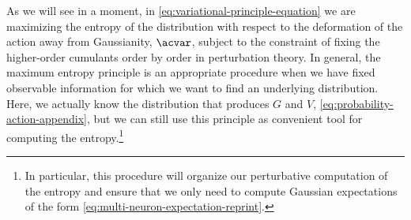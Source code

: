 {} As we will see in a moment, in \eqref{eq:variational-principle-equation} we are maximizing the entropy of the distribution with respect to the deformation of the action away from Gaussianity, $\acvar$, subject to the constraint of fixing the higher-order cumulants order by order in perturbation theory. In general, the maximum entropy principle is an appropriate procedure when we have fixed observable information for which we want to find an underlying distribution. Here, we actually know the distribution that produces $G$ and $V$, \eqref{eq:probability-action-appendix}, but we can still use this principle as convenient tool for computing the entropy.\footnote{
    In particular, this procedure will organize our perturbative computation of the entropy and ensure that we only need to compute Gaussian expectations of the form \eqref{eq:multi-neuron-expectation-reprint}.
}









